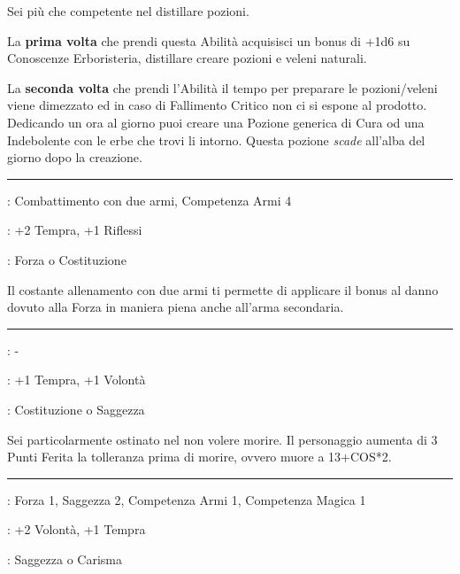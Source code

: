 \begin{multicols}{2}
Sei più che competente nel distillare pozioni.

La \textbf{prima volta} che prendi questa Abilità acquisisci un bonus di +1d6 su Conoscenze Erboristeria, distillare creare pozioni e veleni naturali.

La \textbf{seconda volta} che prendi l'Abilità il tempo per preparare le pozioni/veleni viene dimezzato ed in caso di Fallimento Critico non ci si espone al prodotto. Dedicando un ora al giorno puoi creare una Pozione generica di Cura od una Indebolente con le erbe che trovi li intorno. Questa pozione \emph{scade} all'alba del giorno dopo la creazione.

\smallskip\noindent\rule{\linewidth}{2pt} \hypertarget{Doppia porzione}{}\medskip{}
\noindent
\begin{description}[noitemsep, topsep=0pt, parsep=0pt, partopsep=0pt, leftmargin=0cm, labelwidth=2.5cm]
    \item[\textbf{Requisito}]: Combattimento con due armi, Competenza Armi 4
    \item[\textbf{Tiri Salvezza}]: +2 Tempra, +1 Riflessi
    \item[\textbf{Caratteristica}]: Forza o Costituzione
\end{description}

Il costante allenamento con due armi ti permette di applicare il bonus al danno dovuto alla Forza in maniera piena anche all'arma secondaria.

\smallskip\noindent\rule{\linewidth}{2pt} \hypertarget{Duro a morire}{}\medskip{}\label{Duro a morire}
\noindent
\begin{description}[noitemsep, topsep=0pt, parsep=0pt, partopsep=0pt, leftmargin=0cm, labelwidth=2.5cm]
    \item[\textbf{Requisito}]: -
    \item[\textbf{Tiri Salvezza}]: +1 Tempra, +1 Volontà
    \item[\textbf{Caratteristica}]: Costituzione o Saggezza
\end{description}

Sei particolarmente ostinato nel non volere morire. Il personaggio aumenta di 3 Punti Ferita la tolleranza prima di morire, ovvero muore a 13+COS*2.

\smallskip\noindent\rule{\linewidth}{2pt} \hypertarget{Energia Psichica}{}\medskip{}
\noindent
\begin{description}[noitemsep, topsep=0pt, parsep=0pt, partopsep=0pt, leftmargin=0cm, labelwidth=2.5cm]
    \item[\textbf{Requisito}]: Forza 1, Saggezza 2, Competenza Armi 1, Competenza Magica 1
    \item[\textbf{Tiri Salvezza}]: +2 Volontà, +1 Tempra
    \item[\textbf{Caratteristica}]: Saggezza o Carisma
\end{description}


\end{multicols}
